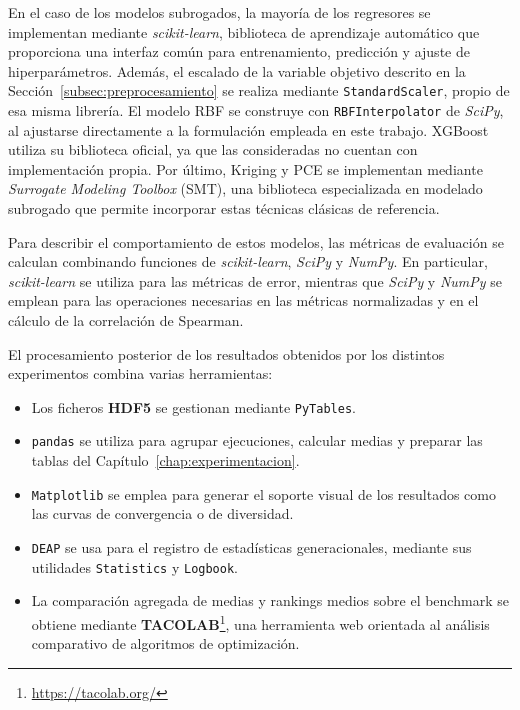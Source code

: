 En el caso de los modelos subrogados, la mayoría de los regresores se implementan mediante \textit{scikit-learn}, biblioteca de aprendizaje automático que proporciona una interfaz común para entrenamiento, predicción y ajuste de hiperparámetros. Además, el escalado de la variable objetivo descrito en la Sección~\ref{subsec:preprocesamiento} se realiza mediante \texttt{StandardScaler}, propio de esa misma librería. El modelo RBF se construye con \texttt{RBFInterpolator} de \textit{SciPy}, al ajustarse directamente a la formulación empleada en este trabajo. XGBoost utiliza su biblioteca oficial, ya que las consideradas no cuentan con implementación propia. Por último, Kriging y PCE se implementan mediante \textit{Surrogate Modeling Toolbox} (SMT), una biblioteca especializada en modelado subrogado que permite incorporar estas técnicas clásicas de referencia.

Para describir el comportamiento de estos modelos, las métricas de evaluación se calculan combinando funciones de \textit{scikit-learn}, \textit{SciPy} y \textit{NumPy}. En particular, \textit{scikit-learn} se utiliza para las métricas de error, mientras que \textit{SciPy} y \textit{NumPy} se emplean para las operaciones necesarias en las métricas normalizadas y en el cálculo de la correlación de Spearman.

El procesamiento posterior de los resultados obtenidos por los distintos experimentos combina varias herramientas:

\begin{itemize}
    \item Los ficheros \textbf{HDF5} se gestionan mediante \texttt{PyTables}.
    \item \texttt{pandas} se utiliza
          para agrupar ejecuciones, calcular medias y preparar las tablas del Capítulo~\ref{chap:experimentacion}.
    \item \texttt{Matplotlib} se emplea para generar el soporte visual de los resultados como las curvas de convergencia o de diversidad.
    \item \texttt{DEAP} se usa para el registro de estadísticas
          generacionales, mediante sus utilidades \texttt{Statistics} y \texttt{Logbook}.
    \item La comparación agregada de medias y rankings medios sobre el benchmark se obtiene mediante \textbf{TACOLAB}\footnote{\url{https://tacolab.org/}}, una herramienta web
          orientada al análisis comparativo de algoritmos de optimización.
\end{itemize}

